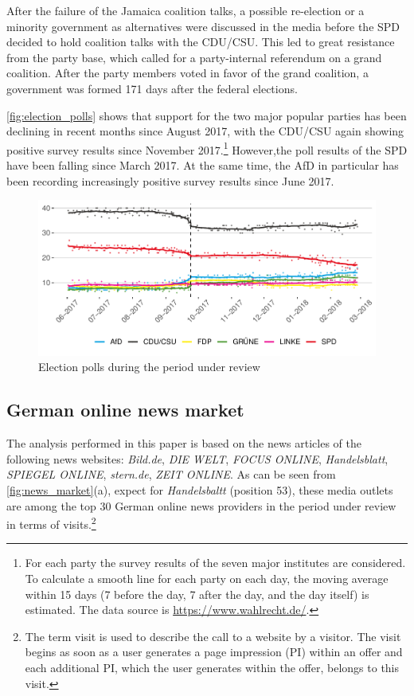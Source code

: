 \documentclass[
]{article}
\begin{document}
After the failure of the Jamaica coalition talks, a possible re-election
or a minority government as alternatives were discussed in the media
before the SPD decided to hold coalition talks with the CDU/CSU. This
led to great resistance from the party base, which called for a
party-internal referendum on a grand coalition. After the party members
voted in favor of the grand coalition, a government was formed 171 days
after the federal elections.

\autoref{fig:election_polls} shows that support for the two major
popular parties has been declining in recent months since August 2017,
with the CDU/CSU again showing positive survey results since November
2017.\footnote{For each party the survey results of the seven major
  institutes are considered. To calculate a smooth line for each party
  on each day, the moving average within 15 days (7 before the day, 7
  after the day, and the day itself) is estimated. The data source is
  \url{https://www.wahlrecht.de/}.} However,the poll results of the SPD
have been falling since March 2017. At the same time, the AfD in
particular has been recording increasingly positive survey results since
June 2017.

\begin{figure}

{\centering \includegraphics[width=0.6\linewidth]{main_text_files/figure-latex/election polls-1} 

}

\caption{Election polls during the period under review \label{fig:election_polls}}\label{fig:election polls}
\end{figure}

\hypertarget{german-online-news-market}{%
\subsection{German online news market}\label{german-online-news-market}}

The analysis performed in this paper is based on the news articles of
the following news websites: \emph{Bild.de}, \emph{DIE WELT},
\emph{FOCUS ONLINE}, \emph{Handelsblatt}, \emph{SPIEGEL ONLINE},
\emph{stern.de}, \emph{ZEIT ONLINE}. As can be seen from
\autoref{fig:news_market}(a), expect for \emph{Handelsbaltt} (position
53), these media outlets are among the top 30 German online news
providers in the period under review in terms of visits.\footnote{The
  term visit is used to describe the call to a website by a visitor. The
  visit begins as soon as a user generates a page impression (PI) within
  an offer and each additional PI, which the user generates within the
  offer, belongs to this visit.}
\end{document}
